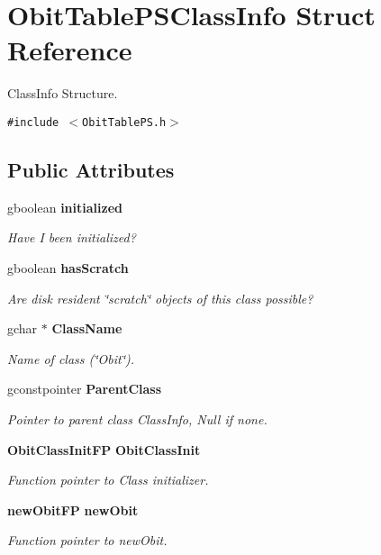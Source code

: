 \section{Obit\-Table\-PSClass\-Info Struct Reference}
\label{structObitTablePSClassInfo}
Class\-Info Structure.  


{\tt \#include $<$Obit\-Table\-PS.h$>$}

\subsection*{Public Attributes}
\begin{CompactItemize}
\item 
gboolean {\bf initialized}
\begin{CompactList}\small\item\em Have I been initialized? \item\end{CompactList}\item 
gboolean {\bf has\-Scratch}
\begin{CompactList}\small\item\em Are disk resident \char`\"{}scratch\char`\"{} objects of this class possible? \item\end{CompactList}\item 
gchar $\ast$ {\bf Class\-Name}
\begin{CompactList}\small\item\em Name of class (\char`\"{}Obit\char`\"{}). \item\end{CompactList}\item 
gconstpointer {\bf Parent\-Class}
\begin{CompactList}\small\item\em Pointer to parent class Class\-Info, Null if none. \item\end{CompactList}\item 
{\bf Obit\-Class\-Init\-FP} {\bf Obit\-Class\-Init}
\begin{CompactList}\small\item\em Function pointer to Class initializer. \item\end{CompactList}\item 
{\bf new\-Obit\-FP} {\bf new\-Obit}
\begin{CompactList}\small\item\em Function pointer to new\-Obit. \item\end{CompactList}\item 

\end{CompactItemize}
